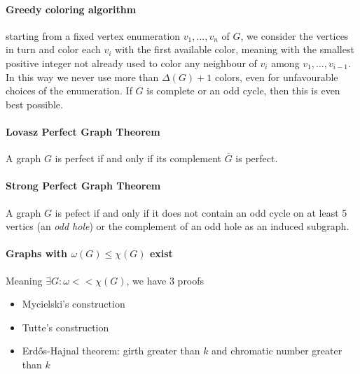 \paragraph{Greedy coloring algorithm} $ $ \\
starting from a fixed vertex enumeration $v_1,...,v_n$ of $G$, we consider the 
vertices in turn and color each $v_i$ with the first available color, meaning 
with the smallest positive integer not already used to color any neighbour of 
$v_i$ among $v_1,...,v_{i-1}$. In this way we never use more than $\Delta(G) +1$
colors, even for unfavourable choices of the enumeration. If $G$ is complete or 
an odd cycle, then this is even best possible.

\paragraph{Lovasz Perfect Graph Theorem}
A graph $G$ is perfect if and only if its complement $\overline{G}$ is perfect.

\paragraph{Strong Perfect Graph Theorem} A graph $G$ is pefect if and only 
if it does not contain an odd cycle on at least 5 vertics (an \textit{odd hole})
or the complement of an odd hole as an induced subgraph.

\paragraph{Graphs with $\omega(G) \leq \chi(G)$ exist}
Meaning $ \exists G: \omega << \chi(G)$, we have 3 proofs 
\begin{itemize}
    \item Mycielski's construction 
    \item Tutte's construction
    \item Erd\H{o}s-Hajnal theorem: girth greater than $k$ and chromatic 
    number greater than $k$
\end{itemize}

